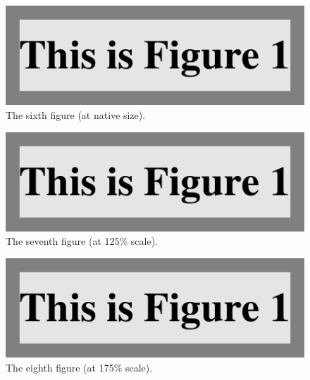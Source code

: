 \begin{figure}[p]
    \centerline{\includegraphics{fig1}}
    \caption{The sixth figure (at native size).}%
\end{figure}

\begin{figure}[p]
    \centerline{\includegraphics[scale = 1.25]{fig1}}
    \caption{The seventh figure (at 125\% scale).}%
\end{figure}

\begin{figure}[p]
    \centerline{\includegraphics[scale = 1.75]{fig1}}
    \caption{The eighth figure (at 175\% scale).}%
\end{figure}

